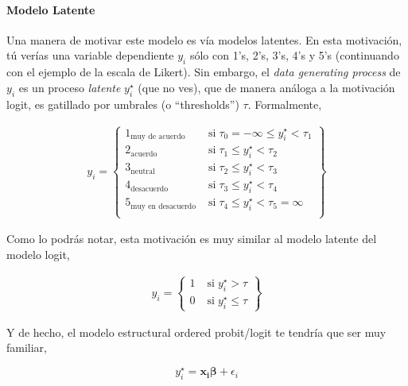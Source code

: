 \documentclass[onesided]{article}\usepackage[]{graphicx}\usepackage[]{color}
\begin{document}
\paragraph{Modelo Latente} Una manera de motivar este modelo es v\'ia modelos latentes. En esta motivaci\'on, t\'u ver\'ias una variable dependiente $y_{i}$ s\'olo con 1's, 2's, 3's, 4's y 5's (continuando con el ejemplo de la escala de Likert). Sin embargo, el \emph{data generating process} de $y_{i}$ es un proceso \emph{latente} $y_{i}^{\star}$ (que no ves), que de manera an\'aloga a la motivaci\'on logit, es gatillado por umbrales (o ``thresholds'') $\tau$. Formalmente, 


\begin{equation}\label{latente}
\begin{split}
y_{i}=  
  \begin{Bmatrix} 
    1_{\text{muy de acuerdo}} & \;\text{si}\; \tau_{0} = -\infty \leq y_{i}^{\star} < \tau_{1} \\ 
    2_{\text{acuerdo}} & \;\text{si}\; \tau_{1}   \leq y_{i}^{\star} < \tau_{2} \\ 
    3_{\text{neutral}} & \;\text{si}\; \tau_{2}   \leq y_{i}^{\star} < \tau_{3} \\ 
    4_{\text{desacuerdo}} & \;\text{si}\; \tau_{3}   \leq y_{i}^{\star} < \tau_{4} \\ 
    5_{\text{muy en desacuerdo}} & \;\text{si}\; \tau_{4}   \leq y_{i}^{\star} < \tau_{5} = \infty \\ 
  \end{Bmatrix}
\end{split}
\end{equation}

Como lo podr\'as notar, esta motivaci\'on es muy similar al modelo latente del modelo logit,

\begin{equation}\label{logit}
\begin{split}
y_{i}=  
  \begin{Bmatrix} 
    1 & \;\text{si}\; y_{i}^{\star}>\tau \\ 
    0 & \;\text{si}\; y_{i}^{\star}\le\tau 
  \end{Bmatrix}
\end{split}
\end{equation}

Y de hecho, el modelo estructural ordered probit/logit te tendr\'ia que ser muy familiar,

\begin{equation}\label{logit.structural}
y_{i}^{\star} = \boldsymbol{x_{i}}\boldsymbol{\beta} + \epsilon_{i}
\end{equation}
\end{document}
